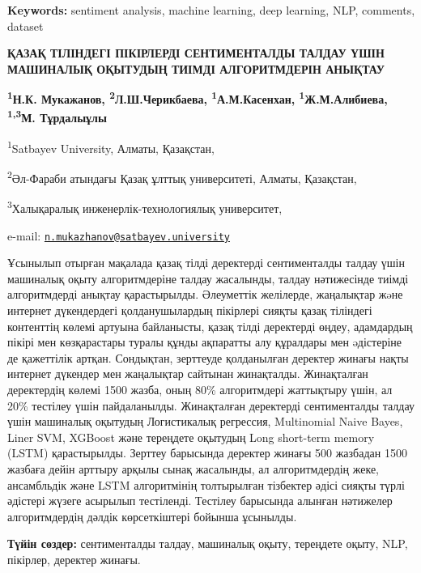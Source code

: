 {\bfseries Keywords:} sentiment analysis, machine learning, deep learning,
NLP, comments, dataset

\begin{articleheader}
{\bfseries ҚАЗАҚ ТІЛІНДЕГІ ПІКІРЛЕРДІ СЕНТИМЕНТАЛДЫ ТАЛДАУ ҮШІН МАШИНАЛЫҚ
ОҚЫТУДЫҢ ТИІМДІ АЛГОРИТМДЕРІН АНЫҚТАУ}

{\bfseries \textsuperscript{1}Н.К. Мукажанов\textsuperscript{\envelope },
\textsuperscript{2}Л.Ш.Черикбаева, \textsuperscript{1}А.М.Касенхан,
\textsuperscript{1}Ж.М.Алибиева,\\
\textsuperscript{1,3}М. Тұрдалыұлы}
\end{articleheader}

\begin{affiliation}
\textsuperscript{1}Satbayev University, Алматы, Қазақстан,

\textsuperscript{2}Әл-Фараби атындағы Қазақ ұлттық университеті, Алматы,
Қазақстан,

\textsuperscript{3}Халықаралық инженерлік-технологиялық университет,

e-mail:
\href{mailto:n.mukazhanov@satbayev.university}{\nolinkurl{n.mukazhanov@satbayev.university}}
\end{affiliation}

Ұсынылып отырған мақалада қазақ тілді деректерді сентименталды талдау
үшін машиналық оқыту алгоритмдеріне талдау жасалынды, талдау нәтижесінде
тиімді алгоритмдерді анықтау қарастырылды. Әлеуметтік желілерде,
жаңалықтар жəне интернет дүкендердегі қолданушылардың пікірлері сияқты
қазақ тіліндегі контенттің көлемі артуына байланысты, қазақ тілді
деректерді өңдеу, адамдардың пікірі мен көзқарастары туралы құнды
ақпаратты алу құралдары мен əдістеріне де қажеттілік артқан. Сондықтан,
зерттеуде қолданылған деректер жинағы нақты интернет дүкендер мен
жаңалықтар сайтынан жинақталды. Жинақталған деректердің көлемі 1500
жазба, оның 80\% алгоритмдері жаттықтыру үшін, ал 20\% тестілеу үшін
пайдаланылды. Жинақталған деректерді сентименталды талдау үшін машиналық
оқытудың Логистикалық регрессия, Multinomial Naive Bayes, Liner SVM,
XGBoost және тереңдете оқытудың Long short-term memory (LSTM)
қарастырылды. Зерттеу барысында деректер жинағы 500 жазбадан 1500
жазбаға дейін арттыру арқылы сынақ жасалынды, ал алгоритмдердің жеке,
ансамбльдік және LSTM алгоритмінің толтырылған тізбектер әдісі сияқты
түрлі әдістері жүзеге асырылып тестіленді. Тестілеу барысында алынған
нәтижелер алгоритмдердің дәлдік көрсеткіштері бойынша ұсынылды.

{\bfseries Түйін сөздер:} сентименталды талдау, машиналық оқыту, тереңдете
оқыту, NLP, пікірлер, деректер жинағы.

